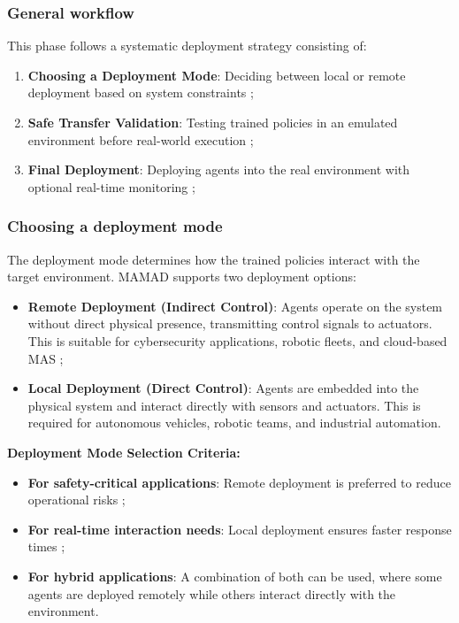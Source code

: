 \documentclass[pdflatex,sn-mathphys-num]{sn-jnl}%
\theoremstyle{thmstyleone}%
\theoremstyle{thmstyletwo}%
\theoremstyle{thmstylethree}%
\begin{document}
\subsubsection{General workflow}
This phase follows a systematic deployment strategy consisting of:
\begin{enumerate}
    \item \textbf{Choosing a Deployment Mode}: Deciding between local or remote deployment based on system constraints ;
    \item \textbf{Safe Transfer Validation}: Testing trained policies in an emulated environment before real-world execution ;
    \item \textbf{Final Deployment}: Deploying agents into the real environment with optional real-time monitoring ;
\end{enumerate}

\subsubsection{Choosing a deployment mode}
The deployment mode determines how the trained policies interact with the target environment. MAMAD supports two deployment options:

\begin{itemize}
    \item \textbf{Remote Deployment (Indirect Control)}: Agents operate on the system without direct physical presence, transmitting control signals to actuators. This is suitable for cybersecurity applications, robotic fleets, and cloud-based MAS ;
    \item \textbf{Local Deployment (Direct Control)}: Agents are embedded into the physical system and interact directly with sensors and actuators. This is required for autonomous vehicles, robotic teams, and industrial automation.
\end{itemize}

\noindent \textbf{Deployment Mode Selection Criteria:}
\begin{itemize}
    \item \textbf{For safety-critical applications}: Remote deployment is preferred to reduce operational risks ;
    \item \textbf{For real-time interaction needs}: Local deployment ensures faster response times ;
    \item \textbf{For hybrid applications}: A combination of both can be used, where some agents are deployed remotely while others interact directly with the environment.
\end{itemize}
\end{document}
